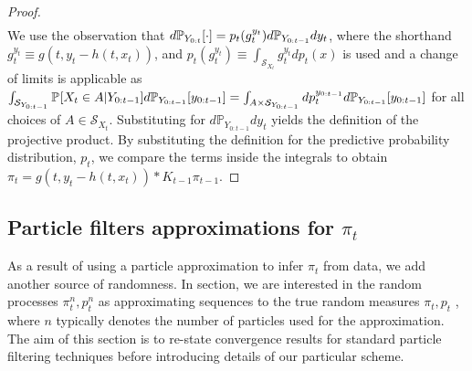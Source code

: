 \begin{lemma}
\begin{proof}
\begin{align}
	\end{align}
	 We use the observation that $d\mathbb{P}_{Y_{0:t}}{[\cdot]} = p_t(g_t^{y_t}) d\mathbb{P}_{Y_{0:t-1}} dy_t$, where the shorthand $g_t^{y_t} \equiv g(t, y_t - h(t, x_t))$, and $p_t(g_t^{y_t}) \equiv \int_{\mathcal{S}_{X_t}} g_t^{y_t} dp_t(x)$ is used and a change of limits is applicable as $\int_{\mathcal{S}_{Y_{0:t-1}}} \mathbb{P}_{{}}{[X_t \in A | Y_{0:t-1}]} d\mathbb{P}_{Y_{0:t-1}}{[y_{0:t-1}]} = \int_{ A \times \mathcal{S}_{Y_{0:t-1}}} dp_t^{y_{0:t-1}} d\mathbb{P}_{Y_{0:t-1}}{[y_{0:t-1}]}$ for all choices of $A \in \mathcal{S}_{X_t}$. Substituting for $d\mathbb{P}_{Y_{0:t-1}} dy_t$ yields the definition of the projective product. By substituting the definition for the predictive probability distribution, $p_t$, we compare the terms inside the integrals to obtain $\pi_t = g(t, y_t - h(t, x_t)) * K_{t-1} \pi_{t-1}$. 	
	
	\end{proof}
\end{lemma}

\subsection{Particle filters approximations for $\pi_t$}

As a result of using a particle approximation to infer $\pi_t$ from data, we add another source of randomness. In section, we are interested in the random processes $\pi_t^n, p_t^n$ as approximating sequences to the true random measures $\pi_t, p_t$ , where $n$ typically denotes the number of particles used for the approximation.  The aim of this section is to re-state convergence results for standard particle filtering techniques before introducing details of our particular scheme.


